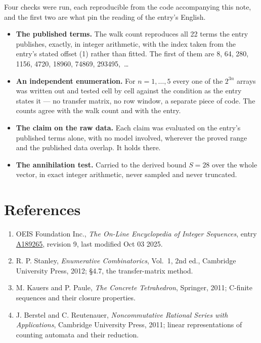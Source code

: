 \documentclass[11pt]{article}
\theoremstyle{definition}
\begin{document}
Four checks were run, each reproducible from the code accompanying this note, and the first two are what pin the reading of the entry's English.

\begin{itemize}

\item {\bfseries The published terms.} The walk count reproduces all 22 terms the entry publishes, exactly, in integer arithmetic, with the index taken from the entry's stated offset (1) rather than fitted. The first of them are 8, 64, 280, 1156, 4720, 18960, 74869, 293495,~\dots

\item {\bfseries An independent enumeration.} For $n = 1,\dots,5$ every one of the $2^{3n}$ arrays was written out and tested cell by cell against the condition as the entry states it --- no transfer matrix, no row window, a separate piece of code. The counts agree with the walk count and with the entry.

\item {\bfseries The claim on the raw data.} Each claim was evaluated on the entry's published terms alone, with no model involved, wherever the proved range and the published data overlap. It holds there.

\item {\bfseries The annihilation test.} Carried to the derived bound $S = 28$ over the whole vector, in exact integer arithmetic, never sampled and never truncated.

\end{itemize}

\section{References}

\begin{enumerate}

\item OEIS Foundation Inc., \emph{The On-Line Encyclopedia of Integer Sequences}, entry \href{https://oeis.org/A189265}{A189265}, revision 9, last modified Oct 03 2025.

\item R. P. Stanley, \emph{Enumerative Combinatorics}, Vol.~1, 2nd ed., Cambridge University Press, 2012; \S4.7, the transfer-matrix method.

\item M. Kauers and P. Paule, \emph{The Concrete Tetrahedron}, Springer, 2011; C-finite sequences and their closure properties.

\item J. Berstel and C. Reutenauer, \emph{Noncommutative Rational Series with Applications}, Cambridge University Press, 2011; linear representations of counting automata and their reduction.

\end{enumerate}
\end{document}
